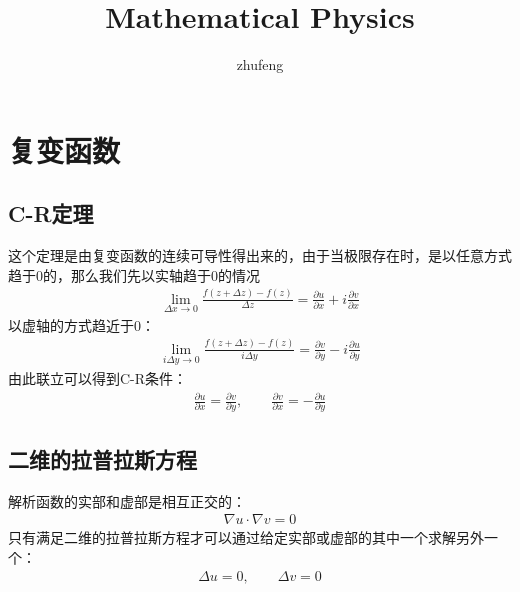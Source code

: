 \documentclass[UTF8]{article}
\begin{document}
\title{Mathematical Physics}
\author{zhufeng}
\date{}
\maketitle
\thispagestyle{empty}%
\newpage%
\tableofcontents
\thispagestyle{empty}%
\newpage
{}%
\section{复变函数}
\subsection{C-R定理}
这个定理是由复变函数的连续可导性得出来的，由于当极限存在时，是以任意方式趋于0的，那么我们先以实轴趋于0的情况
\begin{align*}
	\lim_{\Delta x\rightarrow 0}\frac{f(z+\Delta z)-f(z)}{\Delta z}=\frac{\partial u}{\partial x}+i\frac{\partial v}{\partial x}
\end{align*}
以虚轴的方式趋近于0：
\begin{align*}
	\lim_{i\Delta y\rightarrow 0}\frac{f(z+\Delta z)-f(z)}{i \Delta y}=\frac{\partial v}{\partial y}-i\frac{\partial u}{\partial y}
\end{align*}
由此联立可以得到C-R条件：
\begin{align*}
	\frac{\partial u}{\partial x}=\frac{\partial v}{\partial y},\qquad\frac{\partial v}{\partial x}=-\frac{\partial u}{\partial y}
\end{align*}
\subsection{二维的拉普拉斯方程}
解析函数的实部和虚部是相互正交的：
\begin{align*}
	\nabla u\cdot\nabla v=0
\end{align*}
只有满足二维的拉普拉斯方程才可以通过给定实部或虚部的其中一个求解另外一个：
\begin{align*}
	\Delta u=0,\qquad\Delta v=0
\end{align*}
\end{document}
